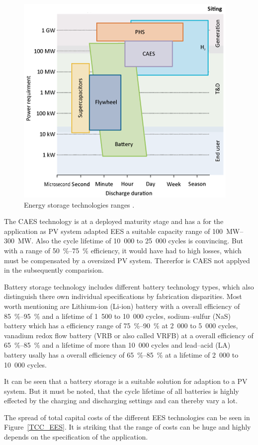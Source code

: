 \begin{figure}[htbp]  
\centering
\includegraphics[width=0.6\linewidth]{FIG/EEStechnologies}
\caption[Energy storage technologies ranges.]{Energy storage technologies ranges \cite{IEA2014c}.}\label{EEStechnologies}
\end{figure}
The CAES technology is at a deployed maturity stage and has a for the application as PV system adapted EES a suitable capacity range of \SIrange{100}{300}{\mega\watt}. Also the cycle lifetime of 10~000 to 25~000 cycles is convincing. But with a range of \SIrange{50}{75}{\percent} efficiency, it would have had to high losses, which must be compensated by a oversized PV system. Thererfor is CAES not applyed in the subsequently comparision.  \cite{IEA2014c}

Battery storage technology includes different battery technology types, which also distinguish there own individual specifications by fabrication disparities. Most worth mentioning are Lithium-ion (Li-ion) battery with a overall efficiency of \SIrange{85}{95}{\percent} and a lifetime of 1~500 to 10~000 cycles, sodium–sulfur (NaS) battery which has a efficiency range of \SIrange{75}{90}{\percent} at 2~000 to 5~000 cycles, vanadium redox flow battery (VRB or also called VRFB) at a overall efficiency of \SIrange{65}{85}{\percent} and a lifetime of more than 10~000 cycles and lead–acid (LA) battery usally has a overall efficiency of \SIrange{65}{85}{\percent} at a lifetime of 2~000 to 10~000 cycles. \cite{IEA2014c,Zakeri2015}

It can be seen that a battery storage is a suitable solution for adaption to a PV system. But it must be noted, that the cycle lifetime of all batteries is highly effected by the charging and discharging settings and can thereby vary a lot.

The spread of total capital costs of the different EES technologies can be seen in Figure~\ref{TCC_EES}. It is striking that the range of costs can be huge and highly depends on the specification of the application.


